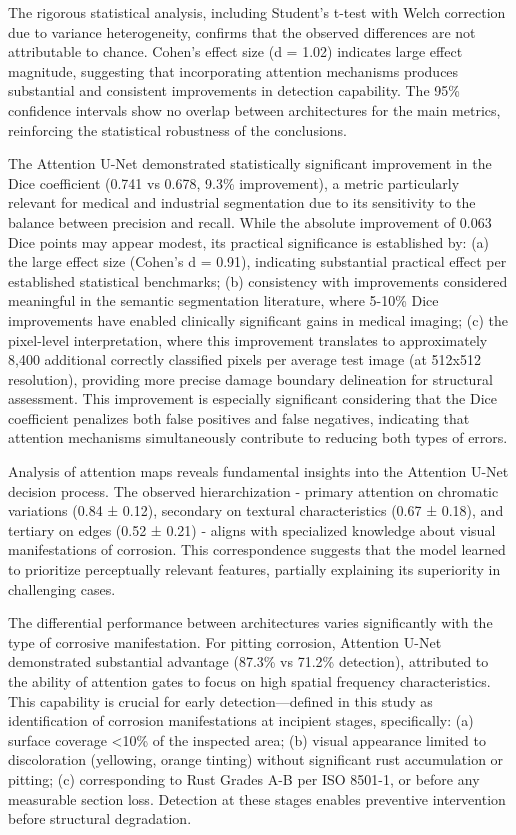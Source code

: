 \documentclass[Journal,letterpaper]{ascelike-new}
\begin{document}
The rigorous statistical analysis, including Student's t-test with Welch correction due to variance heterogeneity, confirms that the observed differences are not attributable to chance. Cohen's effect size (d = 1.02) indicates large effect magnitude, suggesting that incorporating attention mechanisms produces substantial and consistent improvements in detection capability. The 95\% confidence intervals show no overlap between architectures for the main metrics, reinforcing the statistical robustness of the conclusions.

The Attention U-Net demonstrated statistically significant improvement in the Dice coefficient (0.741 vs 0.678, 9.3\% improvement), a metric particularly relevant for medical and industrial segmentation due to its sensitivity to the balance between precision and recall. While the absolute improvement of 0.063 Dice points may appear modest, its practical significance is established by: (a) the large effect size (Cohen's d = 0.91), indicating substantial practical effect per established statistical benchmarks; (b) consistency with improvements considered meaningful in the semantic segmentation literature, where 5-10\% Dice improvements have enabled clinically significant gains in medical imaging; (c) the pixel-level interpretation, where this improvement translates to approximately 8,400 additional correctly classified pixels per average test image (at 512x512 resolution), providing more precise damage boundary delineation for structural assessment. This improvement is especially significant considering that the Dice coefficient penalizes both false positives and false negatives, indicating that attention mechanisms simultaneously contribute to reducing both types of errors.

Analysis of attention maps reveals fundamental insights into the Attention U-Net decision process. The observed hierarchization - primary attention on chromatic variations (0.84 ± 0.12), secondary on textural characteristics (0.67 ± 0.18), and tertiary on edges (0.52 ± 0.21) - aligns with specialized knowledge about visual manifestations of corrosion. This correspondence suggests that the model learned to prioritize perceptually relevant features, partially explaining its superiority in challenging cases.

The differential performance between architectures varies significantly with the type of corrosive manifestation. For pitting corrosion, Attention U-Net demonstrated substantial advantage (87.3\% vs 71.2\% detection), attributed to the ability of attention gates to focus on high spatial frequency characteristics. This capability is crucial for early detection---defined in this study as identification of corrosion manifestations at incipient stages, specifically: (a) surface coverage <10\% of the inspected area; (b) visual appearance limited to discoloration (yellowing, orange tinting) without significant rust accumulation or pitting; (c) corresponding to Rust Grades A-B per ISO 8501-1, or before any measurable section loss. Detection at these stages enables preventive intervention before structural degradation.
\end{document}
